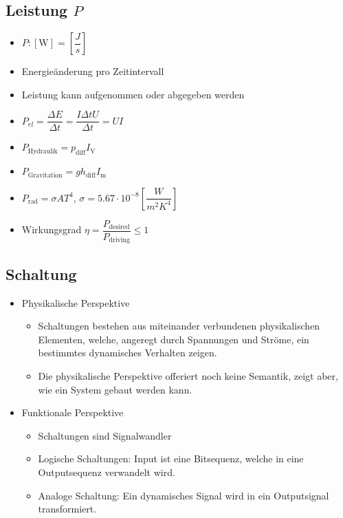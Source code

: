 \documentclass[8pt,a4paper]{scrartcl}
\begin{document}
\begin{multicols*}{3}
		\subsection{Leistung $P$}
			\begin{itemize}\itemsep0pt
				\item $P: [\text{W}] = [\dfrac{J}{s}]$
				\item Energieänderung pro Zeitintervall
				\item Leistung kann aufgenommen oder abgegeben werden
				\item $P_{el}=\dfrac{\Delta E}{\Delta t} = \dfrac{I \Delta t U}{\Delta t} = UI$
				\item  $P_{\text{Hydraulik}}=p_{\text{diff}}I_{\text{V}}$
				\item  $P_{\text{Gravitation}}=g h_{\text{diff}}I_{\text{m}}$
				\item $P_{\text{rad}} = \sigma AT^{4}$, $\sigma = 5.67\cdot 10^{-8} [\dfrac{W}{m^{2}K^{4}}]$
				\item Wirkungsgrad $\eta = \dfrac{P_{\text{desired}}}{P_{\text{driving}}} \leq 1$
			\end{itemize}
			
		\subsection{Schaltung}
			\begin{itemize}\itemsep0pt
				\item Physikalische Perspektive
				\begin{itemize}\itemsep0pt
					\item Schaltungen bestehen aus miteinander verbundenen physikalischen Elementen, welche, angeregt durch Spannungen und Ströme, ein bestimmtes dynamisches Verhalten zeigen.
					\item Die physikalische Perspektive offeriert noch keine Semantik, zeigt aber, wie ein System gebaut werden kann.
				\end{itemize}					
			
				\item Funktionale Perspektive
				\begin{itemize}\itemsep0pt
					\item Schaltungen sind Signalwandler
					\item Logische Schaltungen: Input ist eine Bitsequenz, welche in eine Outputsequenz verwandelt wird.
					\item Analoge Schaltung: Ein dynamisches Signal wird in ein Outputsignal transformiert.
				\end{itemize}						
			\end{itemize}		

\end{multicols*}
\end{document}
